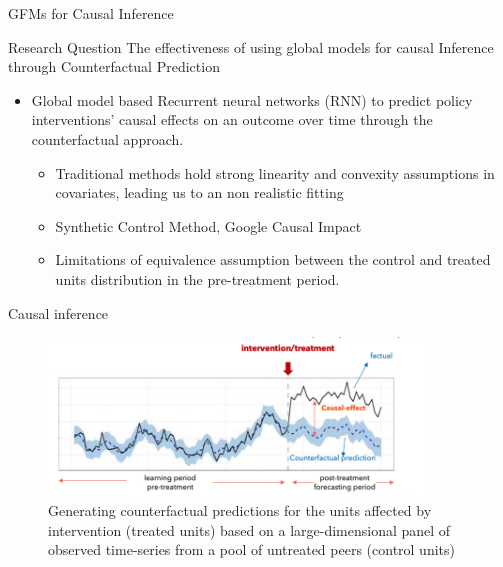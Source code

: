 \documentclass{beamer}
\begin{document}
\begin{frame}{GFMs for Causal Inference}
   \begin{block}{Research Question}	
	The effectiveness of using global models for causal Inference through Counterfactual Prediction
	\end{block}
	\begin{itemize}
	\item Global model based Recurrent neural networks (RNN) to predict policy interventions’ causal effects on an outcome over time through the counterfactual approach.
		\begin{itemize}
		\item \color{blue} Traditional methods hold strong linearity and convexity assumptions in covariates, leading us to an non realistic fitting
		\item \color{blue}  Synthetic Control Method, Google Causal Impact
		\item \color{blue} Limitations of equivalence assumption between the control and treated units distribution in the pre-treatment period.
		\end{itemize}
 \end{itemize}
\end{frame}

\begin{frame}{Causal inference}
\begin{figure}[htbp]
\centerline{\includegraphics[width=0.90\textwidth]{images/causal}}
\caption{ \scriptsize Generating counterfactual predictions for the units affected by intervention (treated units) based on a large-dimensional panel of observed time-series from a pool of untreated peers (control units)}
\label{causal}
\end{figure}
\end{frame}
\end{document}
